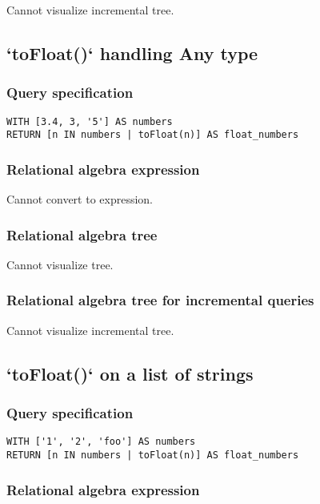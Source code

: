 Cannot visualize incremental tree.

\subsection{`toFloat()` handling Any type}

\subsubsection*{Query specification}

\begin{lstlisting}
WITH [3.4, 3, '5'] AS numbers
RETURN [n IN numbers | toFloat(n)] AS float_numbers
\end{lstlisting}

\subsubsection*{Relational algebra expression}

Cannot convert to expression.

\subsubsection*{Relational algebra tree}

Cannot visualize tree.

\subsubsection*{Relational algebra tree for incremental queries}

Cannot visualize incremental tree.

\subsection{`toFloat()` on a list of strings}

\subsubsection*{Query specification}

\begin{lstlisting}
WITH ['1', '2', 'foo'] AS numbers
RETURN [n IN numbers | toFloat(n)] AS float_numbers
\end{lstlisting}

\subsubsection*{Relational algebra expression}

